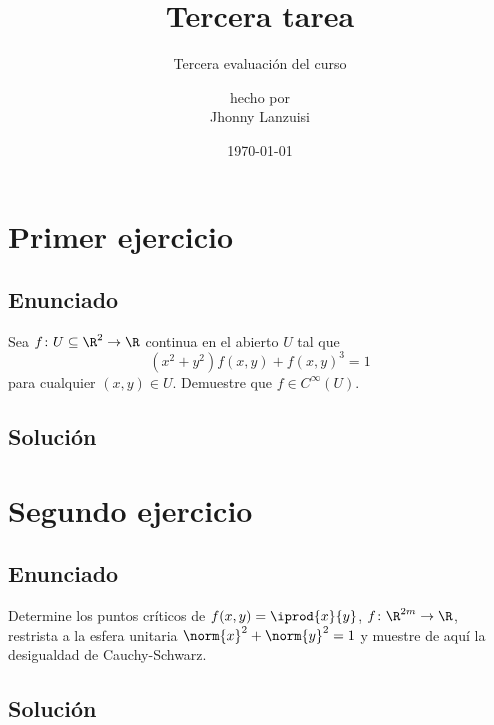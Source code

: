 \documentclass{scrartcl}
\begin{document}
%
\title{Tercera tarea}
\subtitle{Tercera evaluación del curso}
\subject{Análisis III}
\titlehead{Universidad Simón Bolívar\hfill Caracas, Venezuela}
\author{{\normalsize hecho por} \\ Jhonny Lanzuisi}
\date{\today}
\maketitle

\section{Primer ejercicio}

\subsection{Enunciado}
Sea \(f\colon U\subseteq\R^{2}\to\R\) continua en el abierto \(U\)
tal que
\[
(x^2+y^2)f(x,y) + f(x,y)^3 = 1
\]
para cualquier \((x,y)\in U\). Demuestre que \(f\in C^\infty (U)\).

\subsection{Solución}

\section{Segundo ejercicio}

\subsection{Enunciado}
Determine los puntos críticos de \(f(x,y) = \iprod{x}{y}\),
\(f\colon\R^{2m}\to\R\), restrista a la esfera unitaria
\(\norm{x}^2+\norm{y}^2 = 1\) y muestre de aquí la desigualdad
de Cauchy-Schwarz.

\subsection{Solución}


\end{document}

